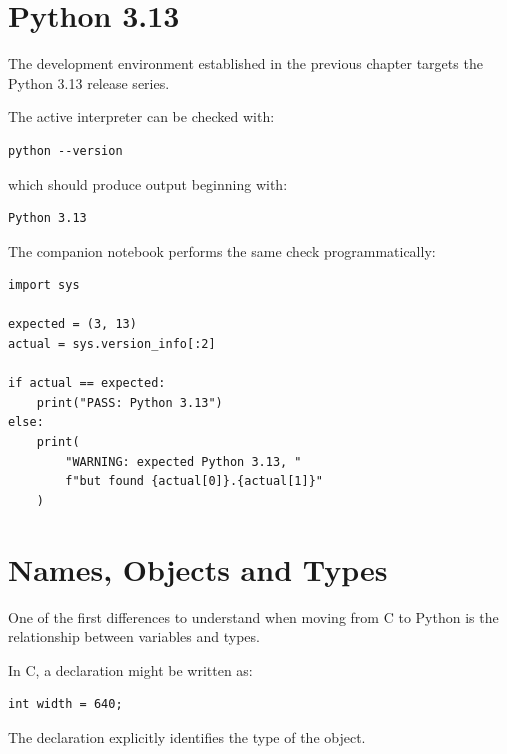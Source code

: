 \section{Python 3.13}
\label{sec:python-313}

The development environment established in the previous chapter
targets the Python 3.13 release series.

The active interpreter can be checked with:

\begin{verbatim}
python --version
\end{verbatim}

which should produce output beginning with:

\begin{verbatim}
Python 3.13
\end{verbatim}

The companion notebook performs the same check programmatically:

\begin{listing}[htbp]
    \caption{Checking the Python version from within a program.}
    \label{lst:check-python-version-ch03}

\begin{verbatim}
import sys

expected = (3, 13)
actual = sys.version_info[:2]

if actual == expected:
    print("PASS: Python 3.13")
else:
    print(
        "WARNING: expected Python 3.13, "
        f"but found {actual[0]}.{actual[1]}"
    )
\end{verbatim}

\end{listing}


\section{Names, Objects and Types}
\label{sec:python-names-objects}

One of the first differences to understand when moving from C to
Python is the relationship between variables and types.

In C, a declaration might be written as:

\begin{verbatim}
int width = 640;
\end{verbatim}

The declaration explicitly identifies the type of the object.


